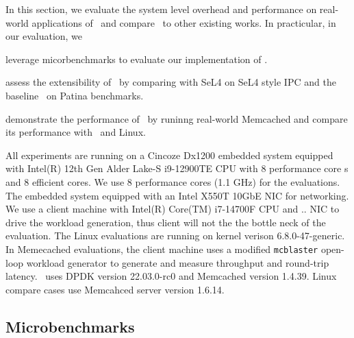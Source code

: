 In this section, we evaluate the system level overhead and performance on real-world applications of \name\ and compare \name\ to other existing works.
In practicular, in our evaluation, we
\begin{inparaenum}[(1)]
\item leverage micorbenchmarks to evaluate our implementation of \name .
\item assess the extensibility of \name\ by comparing with SeL4 on SeL4 style IPC and the baseline \cos\ on Patina benchmarks.
\item demonstrate the performance of \name\ by runinng real-world Memcached and compare its performance with \cos\ and Linux.
\end{inparaenum}

All experiments are running on a Cincoze Dx1200 embedded system equipped with Intel(R) 12th Gen Alder Lake-S i9-12900TE CPU with 8 performance core s and 8 efficient cores.
We use 8 performance cores (1.1 GHz) for the evaluations.
The embedded system equipped with an Intel X550T 10GbE NIC for networking.
We use a client machine with Intel(R) Core(TM) i7-14700F CPU and .. NIC to drive the workload generation, thus client will not the the bottle neck of the evaluation.
The Linux evaluations are running on kernel verison 6.8.0-47-generic.
In Memecached evaluations, the client machine uses a modified {\tt mcblaster} open-loop workload generator to generate and measure throughput and round-trip latency.
\name\ uses DPDK version 22.03.0-rc0 and Memcached version 1.4.39.
Linux compare cases use Memcahced server version 1.6.14.

\subsection{Microbenchmarks}
\label{ss:eval_micro}

